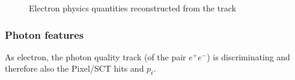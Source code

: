 				\begin{figure}
					\centering
					 \quad
					\newline
					 \quad
					\caption{Electron physics quantities reconstructed from the track}
					\label{fig:el_physics_quantities}
				\end{figure}
				
				
				
				\subsubsection{Photon features}
				As electron, the photon quality track (of the pair $e^{+}e^{-}$) is discriminating and therefore also the Pixel/SCT hits and $p_t$.
				
